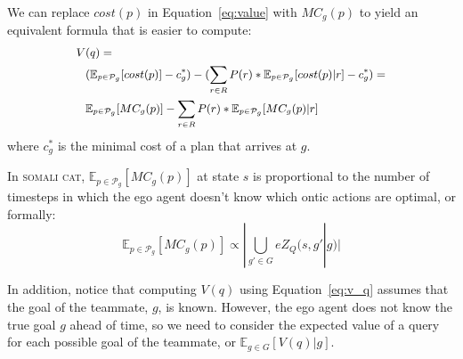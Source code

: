 \documentclass[letterpaper]{article}
\newtheorem{definition}{Definition}
\begin{document}
\noindent We can replace $cost(p)$ in Equation~\ref{eq:value} with $MC_g(p)$ to yield an equivalent formula that is easier to compute:
\begin{equation}
\small
\begin{split}
    V & (q) = \\
    & (\mathbb{E}_{p\in \mathcal{P}_g}[cost(p)] - c^*_g) - (\sum\limits_{r\in R}P(r)*\mathbb{E}_{p\in \mathcal{P}_g}[cost(p) | r] - c^*_g) =\\ &
    \mathbb{E}_{p\in \mathcal{P}_g}[MC_g(p)] - \sum\limits_{r\in R}P(r)*\mathbb{E}_{p\in \mathcal{P}_g}[MC_g(p) | r]
    \end{split}
    \label{eq:v_q}
\end{equation}
where $c^*_g$ is the minimal cost of a plan that arrives at $g$.

In \textsc{somali cat},
$\mathbb{E}_{p\in\mathcal{P}_g}[MC_g(p)]$ at state $s$ is proportional to the number of timesteps in which the ego agent doesn't know which ontic actions are optimal, or formally:
\begin{equation*}
    \mathbb{E}_{p\in \mathcal{P}_g}[MC_g(p)]\propto |\bigcup\limits_{g'\in G}eZ_Q(s, g' | g)|
\end{equation*}

In addition, notice that computing $V(q)$ using Equation~\ref{eq:v_q} assumes that the goal of the teammate, $g$, is known. However, the ego agent does not know the true goal $g$ ahead of time, so we need to consider the expected value of a query for each possible goal of the teammate, or $\mathbb{E}_{g\in G}[V(q) | g]$.

\end{document}
